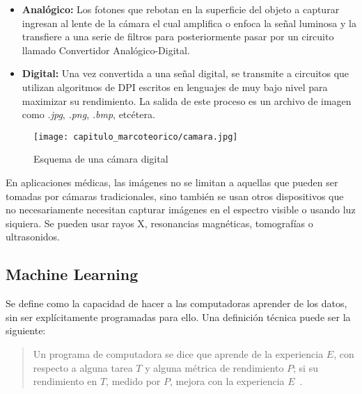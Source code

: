 \begin{itemize}
    \item{\textbf{Analógico:}} Los fotones que rebotan en la superficie del
    objeto a capturar ingresan al lente de la cámara el cual amplifica o enfoca
    la señal luminosa y la transfiere a una serie de filtros para posteriormente
    pasar por un circuito llamado Convertidor Analógico-Digital.
    \item{\textbf{Digital:}} Una vez convertida a una señal digital, se
    transmite a circuitos que utilizan algoritmos de DPI escritos en lenguajes
    de muy bajo nivel para maximizar su rendimiento. La salida de este proceso
    es un archivo de imagen como \emph{.jpg}, \emph{.png}, \emph{.bmp}, etcétera.
\end{itemize}

\begin{figure}[H]
    \centering
    \texttt{[image: capitulo\_marcoteorico/camara.jpg]}
    \caption{Esquema de una cámara digital}\label{fig:camara}
\end{figure}

En aplicaciones médicas, las imágenes no se limitan a aquellas que pueden ser
tomadas por cámaras tradicionales, sino también se usan otros dispositivos que
no necesariamente necesitan capturar imágenes en el espectro visible o usando
luz siquiera. Se pueden usar rayos X, resonancias magnéticas, tomografías o
ultrasonidos.



\subsection{Machine Learning}

Se define como la capacidad de hacer a las computadoras aprender de los datos,
sin ser explícitamente programadas para ello. Una definición técnica puede ser
la siguiente: 

\begin{quotation}
    Un programa de computadora se dice que aprende de la experiencia
\( E \), con respecto a alguna tarea \( T \) y alguna métrica de rendimiento \( P \);
si su rendimiento en \( T \), medido por \( P \), mejora con la experiencia \( E \)~\cite{Mitchell1997}.
\end{quotation}

